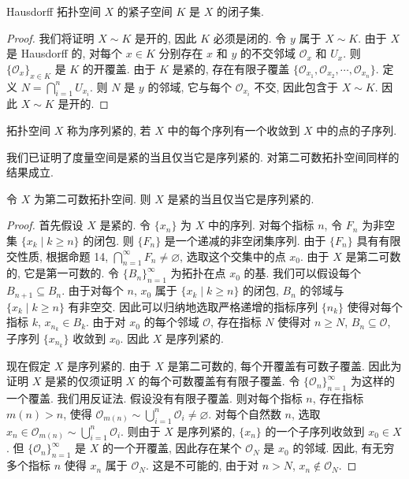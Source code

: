 \documentclass[../../main.tex]{subfiles}
\begin{document}
\begin{proposition}\label{proposition:ch11-Hausdorff紧闭}
Hausdorff 拓扑空间 $X$ 的紧子空间 $K$ 是 $X$ 的闭子集.
\end{proposition}

\begin{proof}
我们将证明 $X\sim K$ 是开的, 因此 $K$ 必须是闭的. 令 $y$ 属于 $X\sim K$. 由于 $X$ 是 Hausdorff 的, 对每个 $x\in K$ 分别存在 $x$ 和 $y$ 的不交邻域 $\mathcal{O}_{x}$ 和 $U_{x}$. 则 $\{\mathcal{O}_{x}\}_{x\in K}$ 是 $K$ 的开覆盖. 由于 $K$ 是紧的, 存在有限子覆盖 $\{\mathcal{O}_{x_{1}},\mathcal{O}_{x_{2}},\cdots,\mathcal{O}_{x_{n}}\}$. 定义 $N=\bigcap_{i=1}^{n}U_{x_{i}}$. 则 $N$ 是 $y$ 的邻域, 它与每个 $\mathcal{O}_{x_{i}}$ 不交, 因此包含于 $X\sim K$. 因此 $X\sim K$ 是开的.
\end{proof}

\begin{definition}[序列紧]\label{definition:ch11-序列紧}
拓扑空间 $X$ 称为序列紧的, 若 $X$ 中的每个序列有一个收敛到 $X$ 中的点的子序列.
\end{definition}

我们已证明了度量空间是紧的当且仅当它是序列紧的. 对第二可数拓扑空间同样的结果成立.

\begin{proposition}\label{proposition:ch11-第二可数紧}
令 $X$ 为第二可数拓扑空间. 则 $X$ 是紧的当且仅当它是序列紧的.
\end{proposition}

\begin{proof}
首先假设 $X$ 是紧的. 令 $\{x_{n}\}$ 为 $X$ 中的序列. 对每个指标 $n$, 令 $F_{n}$ 为非空集 $\{x_{k}\mid k\geqslant n\}$ 的闭包. 则 $\{F_{n}\}$ 是一个递减的非空闭集序列. 由于 $\{F_{n}\}$ 具有有限交性质, 根据命题 14, $\bigcap_{n=1}^{\infty}F_{n}\neq\varnothing$, 选取这个交集中的点 $x_{0}$. 由于 $X$ 是第二可数的, 它是第一可数的. 令 $\{B_{n}\}_{n=1}^{\infty}$ 为拓扑在点 $x_{0}$ 的基. 我们可以假设每个 $B_{n+1}\subseteq B_{n}$. 由于对每个 $n$, $x_{0}$ 属于 $\{x_{k}\mid k\geqslant n\}$ 的闭包, $B_{n}$ 的邻域与 $\{x_{k}\mid k\geqslant n\}$ 有非空交. 因此可以归纳地选取严格递增的指标序列 $\{n_{k}\}$ 使得对每个指标 $k$, $x_{n_{k}}\in B_{k}$. 由于对 $x_{0}$ 的每个邻域 $\mathcal{O}$, 存在指标 $N$ 使得对 $n\geqslant N$, $B_{n}\subseteq\mathcal{O}$, 子序列 $\{x_{n_{k}}\}$ 收敛到 $x_{0}$. 因此 $X$ 是序列紧的.

现在假定 $X$ 是序列紧的. 由于 $X$ 是第二可数的, 每个开覆盖有可数子覆盖. 因此为证明 $X$ 是紧的仅须证明 $X$ 的每个可数覆盖有有限子覆盖. 令 $\{\mathcal{O}_{n}\}_{n=1}^{\infty}$ 为这样的一个覆盖. 我们用反证法. 假设没有有限子覆盖. 则对每个指标 $n$, 存在指标 $m(n)>n$, 使得 $\mathcal{O}_{m(n)}\sim\bigcup_{i=1}^{n}\mathcal{O}_{i}\neq\varnothing$. 对每个自然数 $n$, 选取 $x_{n}\in\mathcal{O}_{m(n)}\sim\bigcup_{i=1}^{n}\mathcal{O}_{i}$. 则由于 $X$ 是序列紧的, $\{x_{n}\}$ 的一个子序列收敛到 $x_{0}\in X$. 但 $\{\mathcal{O}_{n}\}_{n=1}^{\infty}$ 是 $X$ 的一个开覆盖, 因此存在某个 $\mathcal{O}_{N}$ 是 $x_{0}$ 的邻域. 因此, 有无穷多个指标 $n$ 使得 $x_{n}$ 属于 $\mathcal{O}_{N}$. 这是不可能的, 由于对 $n>N$, $x_{n}\notin\mathcal{O}_{N}$.
\end{proof}
\end{document}
